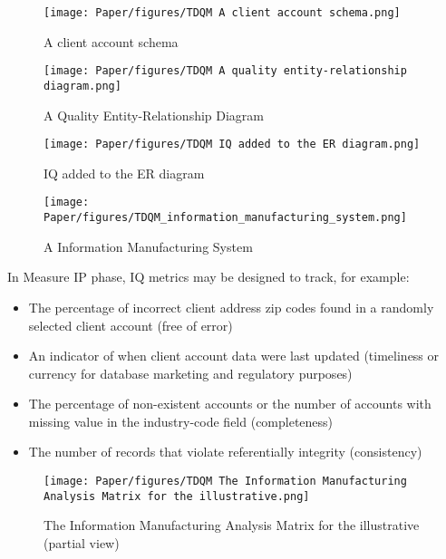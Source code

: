 \documentclass[pdftex,english,oribibl]{llncs}
\begin{document}
\begin{figure}
    \centering
    \texttt{[image: Paper/figures/TDQM A client account schema.png]}
    \caption{A client account schema \cite{Wang1998TDQM}}
    \label{fig:AccountSchema}
 \end{figure}

\begin{figure}
    \centering
    \texttt{[image: Paper/figures/TDQM A quality entity-relationship diagram.png]}
    \caption{A Quality Entity-Relationship Diagram \cite{Wang1998TDQM}}
    \label{fig:Quality Entity-Relationship Diagram}
 \end{figure}


\begin{figure}
    \centering
    \texttt{[image: Paper/figures/TDQM IQ added to the ER diagram.png]}
    \caption{IQ added to the ER diagram \cite{Wang1998TDQM}}
    \label{fig:IQ added to the ER diagram}
 \end{figure}


\begin{figure}
    \centering
    \texttt{[image: Paper/figures/TDQM\_information\_manufacturing\_system.png]}
    \caption{A Information Manufacturing System \cite{Wang1998TDQM}}
    \label{fig:InformationManufacturingSystem}
 \end{figure}

In Measure IP phase, IQ metrics may be designed to track, for example:
\begin{itemize}
    \item The percentage of incorrect client address zip codes
found in a randomly selected client account (free of
error)
    \item An indicator of when client account data were last
updated (timeliness or currency for database marketing and regulatory purposes)
    \item The percentage of non-existent accounts or the
number of accounts with missing value in the
industry-code field (completeness)
    \item The number of records that violate referentially
integrity (consistency)
\end{itemize}

\begin{figure}
    \centering
    \texttt{[image: Paper/figures/TDQM The Information Manufacturing Analysis Matrix for the illustrative.png]}
    \caption{The Information Manufacturing Analysis Matrix for the illustrative (partial view) \cite{Ballou1998ModelingInformation}}
    \label{fig:Information Manufacturing Analysis Matrix}
 \end{figure}
\end{document}
